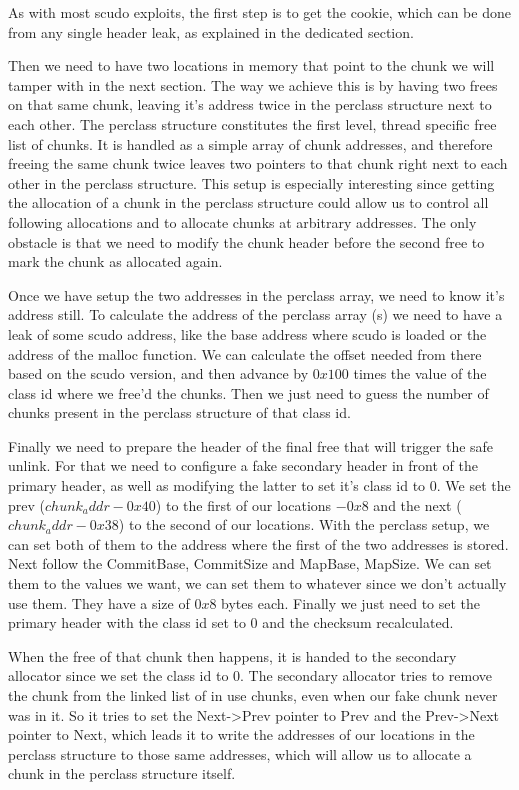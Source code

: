 \documentclass[a4paper,11pt,oneside]{report}
\begin{document}
As with most scudo exploits, the first step is to get the cookie, which can be done from any single header leak, as explained in the dedicated section.

Then we need to have two locations in memory that point to the chunk we will tamper with in the next section. The way we achieve this is by having two frees on that same chunk, leaving it's address twice in the perclass structure next to each other. The perclass structure constitutes the first level, thread specific free list of chunks. It is handled as a simple array of chunk addresses, and therefore freeing the same chunk twice leaves two pointers to that chunk right next to each other in the perclass structure. This setup is especially interesting since getting the allocation of a chunk in the perclass structure could allow us to control all following allocations and to allocate chunks at arbitrary addresses. The only obstacle is that we need to modify the chunk header before the second free to mark the chunk as allocated again.

Once we have setup the two addresses in the perclass array, we need to know it's address still. To calculate the address of the perclass array (s) we need to have a leak of some scudo address, like the base address where scudo is loaded or the address of the malloc function. We can calculate the offset needed from there based on the scudo version, and then advance by $0x100$ times the value of the class id where we free'd the chunks. Then we just need to guess the number of chunks present in the perclass structure of that class id.

Finally we need to prepare the header of the final free that will trigger the safe unlink. For that we need to configure a fake secondary header in front of the primary header, as well as modifying the latter to set it's class id to 0. We set the prev ($chunk_addr - 0x40$) to the first of our locations $- 0x8$ and the next ($chunk_addr - 0x38$) to the second of our locations. With the perclass setup, we can set both of them to the address where the first of the two addresses is stored.
Next follow the CommitBase, CommitSize and MapBase, MapSize. We can set them to the values we want, we can set them to whatever since we don't actually use them. They have a size of $0x8$ bytes each.
Finally we just need to set the primary header with the class id set to 0 and the checksum recalculated.

When the free of that chunk then happens, it is handed to the secondary allocator since we set the class id to 0. The secondary allocator tries to remove the chunk from the linked list of in use chunks, even when our fake chunk never was in it. So it tries to set the Next->Prev pointer to Prev and the Prev->Next pointer to Next, which leads it to write the addresses of our locations in the perclass structure to those same addresses, which will allow us to allocate a chunk in the perclass structure itself.
\end{document}
